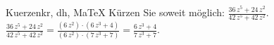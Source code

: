 \begin{MAufgabe}{Kuerzen}{kr, dh, MaTeX}
K\"urzen Sie soweit m\"oglich: $\frac{36\, z^5 + 24\, z^2}{42\, z^5 + 42\, z^2}$.\\ 
\ifLsg\MLoesung
\quad $\frac{36\, z^5 + 24\, z^2}{42\, z^5 + 42\, z^2}=\frac{(6\, z^2)\cdot(6\, z^3 + 4)}{(6\, z^2)\cdot(7\, z^3 + 7)}=\frac{6\, z^3 + 4}{7\, z^3 + 7}$.\else\relax\fi
 \end{MAufgabe}